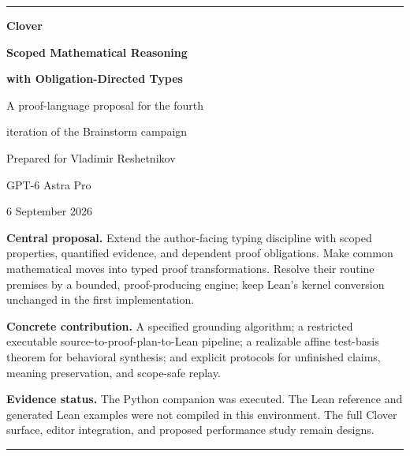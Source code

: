 \documentclass[11pt,a4paper]{article}
\theoremstyle{definition}
\theoremstyle{remark}
\begin{document}
\begin{titlepage}
\vspace*{16mm}
{\color{clover}\rule{\textwidth}{1.1pt}}
\vspace{12mm}
{\fontsize{42}{46}\selectfont\bfseries\color{clover}Clover\par}
\vspace{6mm}
{\LARGE\bfseries Scoped Mathematical Reasoning\par}
\vspace{2mm}
{\LARGE\bfseries with Obligation-Directed Types\par}
\vspace{9mm}
{\large A proof-language proposal for the fourth\par
iteration of the Brainstorm campaign\par}
\vspace{14mm}
{\large Prepared for Vladimir Reshetnikov\par}
{\normalsize GPT-6 Astra Pro\par 6 September 2026\par}
\vfill
\begin{minipage}{.94\textwidth}\setlength{\parskip}{.55em}
\textbf{Central proposal.} Extend the author-facing typing discipline with
scoped properties, quantified evidence, and dependent proof obligations.
Make common mathematical moves into typed proof transformations.
Resolve their routine premises by a bounded, proof-producing engine; keep
Lean's kernel conversion unchanged in the first implementation.

\textbf{Concrete contribution.} A specified grounding algorithm; a restricted
executable source-to-proof-plan-to-Lean pipeline; a realizable affine test-basis
theorem for behavioral synthesis; and explicit protocols for unfinished
claims, meaning preservation, and scope-safe replay.

\textbf{Evidence status.} The Python companion was executed. The Lean reference
and generated Lean examples were not compiled in this environment. The full
Clover surface, editor integration, and proposed performance study remain designs.
\end{minipage}\par
\vspace{10mm}
{\color{clover}\rule{\textwidth}{.5pt}}
\end{titlepage}
\end{document}
